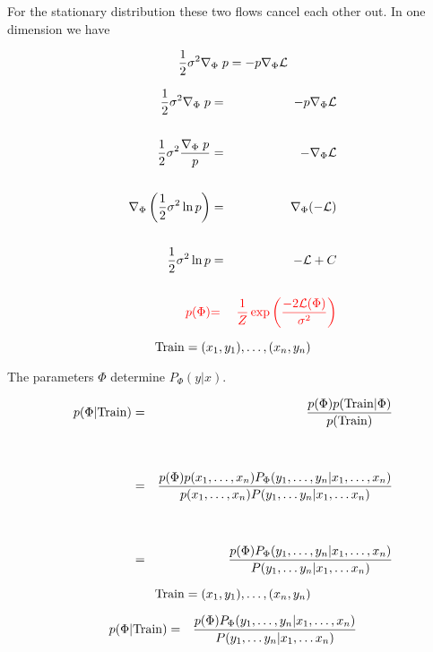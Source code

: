 {\vfill
For the stationary distribution these two flows cancel each other out.
In one dimension we have

$$\frac{1}{2} \sigma^2 \nabla_\Phi\; {p} = - p\nabla_\Phi {\cal L}$$


\vspace{-2ex}
\begin{eqnarray*}
\frac{1}{2} \sigma^2 \nabla_\Phi\; {p} & = & - p\nabla_\Phi {\cal L} \\
\\
\frac{1}{2} \sigma^2 \frac{\nabla_\Phi\;p}{p} & = & - \nabla_\Phi {\cal L} \\
\\
\nabla_\Phi \left(\frac{1}{2} \sigma^2 \ln p\right) & = &  \nabla_\Phi (- {\cal L}) \\
\\
\frac{1}{2} \sigma^2 \ln p & = & - {\cal L} + C \\
\\
{\color{red} p(\Phi)} & {\color{red} =} & {\color{red} \frac{1}{Z}\exp\left(\frac{-2{\cal L}(\Phi)}{\sigma^2}\right)}
\end{eqnarray*}


{\huge
$$\mathrm{Train} = (x_1,y_1),\ldots,(x_n,y_n)$$

\vfill
The parameters $\Phi$ determine $P_\Phi(y|x)$.

\begin{eqnarray*}
p(\Phi|\mathrm{Train}) & = & \frac{p(\Phi)p(\mathrm{Train}|\Phi)}{p(\mathrm{Train})} \\
\\
\\
& = & \frac{p(\Phi)p(x_1,\ldots,x_n)P_\Phi(y_1,\ldots,y_n|x_1,\ldots,x_n)}{p(x_1,\ldots,x_n)P(y_1,\ldots y_n|x_1,\ldots x_n)} \\
\\
\\
& = & \frac{p(\Phi)P_\Phi(y_1,\ldots,y_n|x_1,\ldots,x_n)}{P(y_1,\ldots y_n|x_1,\ldots x_n)}
\end{eqnarray*}
}


$$\mathrm{Train} = (x_1,y_1),\ldots,(x_n,y_n)$$

\vfill
{\huge
\begin{eqnarray*}
p(\Phi|\mathrm{Train}) & = & \frac{p(\Phi)P_\Phi(y_1,\ldots,y_n|x_1,\ldots,x_n)}{P(y_1,\ldots y_n|x_1,\ldots x_n)}
\end{eqnarray*}
}

}
